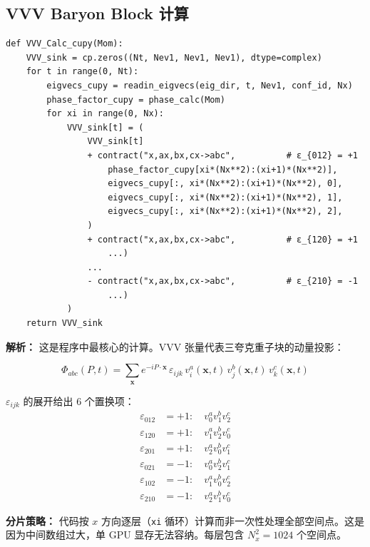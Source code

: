 \documentclass[12pt,a4paper]{ctexart}
\begin{document}
\subsection{VVV Baryon Block 计算}

\begin{lstlisting}[caption={VVV 张量收缩（核心计算）}]
def VVV_Calc_cupy(Mom):
    VVV_sink = cp.zeros((Nt, Nev1, Nev1, Nev1), dtype=complex)
    for t in range(0, Nt):
        eigvecs_cupy = readin_eigvecs(eig_dir, t, Nev1, conf_id, Nx)
        phase_factor_cupy = phase_calc(Mom)
        for xi in range(0, Nx):
            VVV_sink[t] = (
                VVV_sink[t]
                + contract("x,ax,bx,cx->abc",          # ε_{012} = +1
                    phase_factor_cupy[xi*(Nx**2):(xi+1)*(Nx**2)],
                    eigvecs_cupy[:, xi*(Nx**2):(xi+1)*(Nx**2), 0],
                    eigvecs_cupy[:, xi*(Nx**2):(xi+1)*(Nx**2), 1],
                    eigvecs_cupy[:, xi*(Nx**2):(xi+1)*(Nx**2), 2],
                )
                + contract("x,ax,bx,cx->abc",          # ε_{120} = +1
                    ...)
                ...
                - contract("x,ax,bx,cx->abc",          # ε_{210} = -1
                    ...)
            )
    return VVV_sink
\end{lstlisting}

\textbf{解析：}
这是程序中最核心的计算。VVV 张量代表三夸克重子块的动量投影：

\begin{equation}
\Phi_{abc}(P, t) = \sum_{\mathbf{x}} e^{-iP\cdot\mathbf{x}} \, \varepsilon_{ijk} \, v_i^a(\mathbf{x}, t) \, v_j^b(\mathbf{x}, t) \, v_k^c(\mathbf{x}, t)
\end{equation}

$\varepsilon_{ijk}$ 的展开给出 6 个置换项：
\begin{align}
\varepsilon_{012} &= +1: \quad v_0^a v_1^b v_2^c \\
\varepsilon_{120} &= +1: \quad v_1^a v_2^b v_0^c \\
\varepsilon_{201} &= +1: \quad v_2^a v_0^b v_1^c \\
\varepsilon_{021} &= -1: \quad v_0^a v_2^b v_1^c \\
\varepsilon_{102} &= -1: \quad v_1^a v_0^b v_2^c \\
\varepsilon_{210} &= -1: \quad v_2^a v_1^b v_0^c
\end{align}

\textbf{分片策略：} 代码按 $x$ 方向逐层（\texttt{xi} 循环）计算而非一次性处理全部空间点。这是因为中间数组过大，单 GPU 显存无法容纳。每层包含 $N_x^2 = 1024$ 个空间点。
\end{document}
